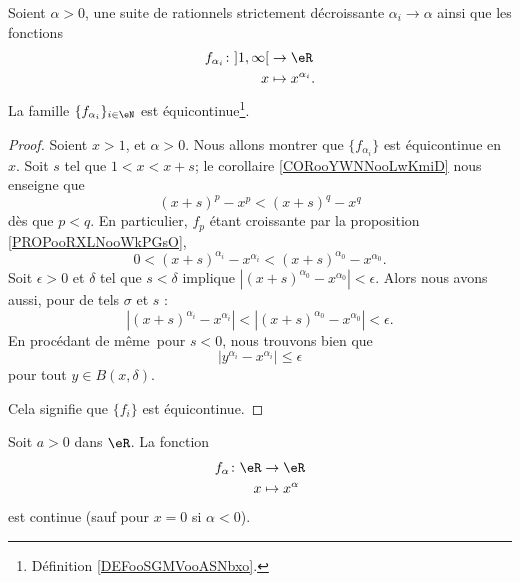\begin{lemma}   \label{LEMooQTNKooLVEytN}
    Soient \( \alpha>0\), une suite de rationnels strictement décroissante \( \alpha_i\to \alpha\) ainsi que les fonctions
    \begin{equation}
        \begin{aligned}
        f_{\alpha_i}\colon \mathopen] 1 , \infty \mathclose[&\to \eR \\
            x&\mapsto x^{\alpha_i}. 
        \end{aligned}
    \end{equation}
    La famille \( \{ f_{\alpha_i} \}_{i\in \eN}\) est équicontinue\footnote{Définition \ref{DEFooSGMVooASNbxo}.}.
\end{lemma}

\begin{proof}
    Soient \( x>1\), et \( \alpha>0\). Nous allons montrer que \( \{ f_{\alpha_i} \}\) est équicontinue en \( x\). Soit \( s\) tel que \( 1<x<x+s\); le corollaire \ref{CORooYWNNooLwKmiD} nous enseigne que 
    \begin{equation}
        (x+s)^p-x^p<(x+s)^q-x^q
    \end{equation}
    dès que \( p<q\). En particulier, \( f_p\) étant croissante par la proposition \ref{PROPooRXLNooWkPGsO},
    \begin{equation}
        0<(x+s)^{\alpha_i}-x^{\alpha_i}<(x+s)^{\alpha_0}-x^{\alpha_0}.
    \end{equation}
    Soit \( \epsilon>0\) et \( \delta\) tel que \( s<\delta\) implique \( | (x+s)^{\alpha_0}-x^{\alpha_0} |<\epsilon\). Alors nous avons aussi, pour de tels \( \sigma\) et \( s\) :
    \begin{equation}
        |(x+s)^{\alpha_i}-x^{\alpha_i}|<|(x+s)^{\alpha_0}-x^{\alpha_0}|<\epsilon.
    \end{equation}
    En procédant de même\ pour \( s<0\), nous trouvons bien que
    \begin{equation}
        | y^{\alpha_i}-x^{\alpha_i} |\leq \epsilon
    \end{equation}
    pour tout \( y\in B(x,\delta)\).

    Cela signifie que \( \{ f_i \}\) est équicontinue.
\end{proof}


\begin{proposition}      \label{PROPooUQNZooSSHLqr}
    Soit \( a>0\) dans \( \eR\). La fonction
    \begin{equation}
        \begin{aligned}
            f_{\alpha}\colon \eR&\to \eR \\
            x&\mapsto x^{\alpha} 
        \end{aligned}
    \end{equation}
    est continue (sauf pour \( x=0\) si \( \alpha<0\)).
\end{proposition}


